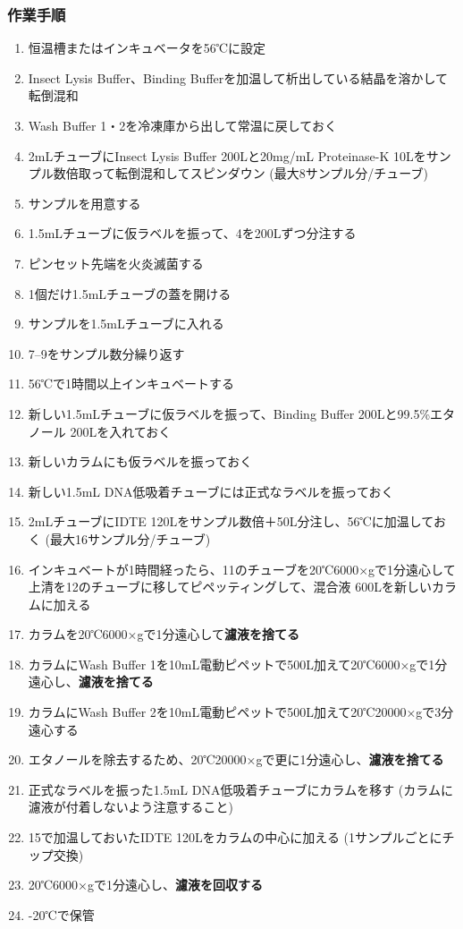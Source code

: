 \documentclass[titlepage,10pt,a4paper,uplatex]{jsbook}
\renewcommand{\textbf}[1]{{\bfseries\sffamily#1}}
\begin{document}
\subsubsection{作業手順}
\begin{enumerate}
\item 恒温槽またはインキュベータを56℃に設定
\item Insect Lysis Buffer、Binding Bufferを加温して析出している結晶を溶かして転倒混和
\item Wash Buffer 1・2を冷凍庫から出して常温に戻しておく
\item 2mLチューブにInsect Lysis Buffer 200{\textmu}Lと20mg/mL Proteinase-K 10{\textmu}Lをサンプル数倍取って転倒混和してスピンダウン (最大8サンプル分/チューブ)
\item サンプルを用意する
\item 1.5mLチューブに仮ラベルを振って、4を200{\textmu}Lずつ分注する
\item ピンセット先端を火炎滅菌する
\item 1個だけ1.5mLチューブの蓋を開ける
\item サンプルを1.5mLチューブに入れる
\item 7--9をサンプル数分繰り返す
\item 56℃で1時間以上インキュベートする
\item 新しい1.5mLチューブに仮ラベルを振って、Binding Buffer 200{\textmu}Lと99.5\%エタノール 200{\textmu}Lを入れておく
\item 新しいカラムにも仮ラベルを振っておく
\item 新しい1.5mL DNA低吸着チューブには正式なラベルを振っておく
\item 2mLチューブにIDTE 120{\textmu}Lをサンプル数倍＋50{\textmu}L分注し、56℃に加温しておく (最大16サンプル分/チューブ)
\item インキュベートが1時間経ったら、11のチューブを20℃6000×gで1分遠心して上清を12のチューブに移してピペッティングして、混合液 600{\textmu}Lを新しいカラムに加える
\item カラムを20℃6000×gで1分遠心して\textbf{濾液を捨てる}
\item カラムにWash Buffer 1を10mL電動ピペットで500{\textmu}L加えて20℃6000×gで1分遠心し、\textbf{濾液を捨てる}
\item カラムにWash Buffer 2を10mL電動ピペットで500{\textmu}L加えて20℃20000×gで3分遠心する
\item エタノールを除去するため、20℃20000×gで更に1分遠心し、\textbf{濾液を捨てる}
\item 正式なラベルを振った1.5mL DNA低吸着チューブにカラムを移す (カラムに濾液が付着しないよう注意すること)
\item 15で加温しておいたIDTE 120{\textmu}Lをカラムの中心に加える (1サンプルごとにチップ交換)
\item 20℃6000×gで1分遠心し、\textbf{濾液を回収する}
\item -20℃で保管
\end{enumerate}
\end{document}
